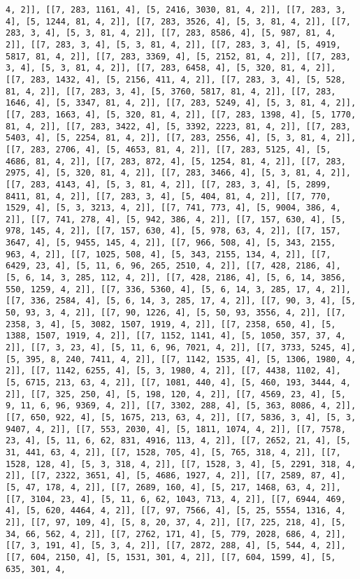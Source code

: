 \documentclass[12pt,fleqn]{article}\usepackage{../../common}
\begin{document}
\begin{verbatim}
4, 2]], [[7, 283, 1161, 4], [5, 2416, 3030, 81, 4, 2]], [[7, 283, 3, 4], [5, 1244, 81, 4, 2]], [[7, 283, 3526, 4], [5, 3, 81, 4, 2]], [[7, 283, 3, 4], [5, 3, 81, 4, 2]], [[7, 283, 8586, 4], [5, 987, 81, 4, 2]], [[7, 283, 3, 4], [5, 3, 81, 4, 2]], [[7, 283, 3, 4], [5, 4919, 5817, 81, 4, 2]], [[7, 283, 3369, 4], [5, 2152, 81, 4, 2]], [[7, 283, 3, 4], [5, 3, 81, 4, 2]], [[7, 283, 6458, 4], [5, 320, 81, 4, 2]], [[7, 283, 1432, 4], [5, 2156, 411, 4, 2]], [[7, 283, 3, 4], [5, 528, 81, 4, 2]], [[7, 283, 3, 4], [5, 3760, 5817, 81, 4, 2]], [[7, 283, 1646, 4], [5, 3347, 81, 4, 2]], [[7, 283, 5249, 4], [5, 3, 81, 4, 2]], [[7, 283, 1663, 4], [5, 320, 81, 4, 2]], [[7, 283, 1398, 4], [5, 1770, 81, 4, 2]], [[7, 283, 3422, 4], [5, 3392, 2223, 81, 4, 2]], [[7, 283, 5403, 4], [5, 2254, 81, 4, 2]], [[7, 283, 2556, 4], [5, 3, 81, 4, 2]], [[7, 283, 2706, 4], [5, 4653, 81, 4, 2]], [[7, 283, 5125, 4], [5, 4686, 81, 4, 2]], [[7, 283, 872, 4], [5, 1254, 81, 4, 2]], [[7, 283, 2975, 4], [5, 320, 81, 4, 2]], [[7, 283, 3466, 4], [5, 3, 81, 4, 2]], [[7, 283, 4143, 4], [5, 3, 81, 4, 2]], [[7, 283, 3, 4], [5, 2899, 8411, 81, 4, 2]], [[7, 283, 3, 4], [5, 404, 81, 4, 2]], [[7, 770, 1529, 4], [5, 3, 3213, 4, 2]], [[7, 741, 773, 4], [5, 9004, 386, 4, 2]], [[7, 741, 278, 4], [5, 942, 386, 4, 2]], [[7, 157, 630, 4], [5, 978, 145, 4, 2]], [[7, 157, 630, 4], [5, 978, 63, 4, 2]], [[7, 157, 3647, 4], [5, 9455, 145, 4, 2]], [[7, 966, 508, 4], [5, 343, 2155, 963, 4, 2]], [[7, 1025, 508, 4], [5, 343, 2155, 134, 4, 2]], [[7, 6429, 23, 4], [5, 11, 6, 96, 265, 2510, 4, 2]], [[7, 428, 2186, 4], [5, 6, 14, 3, 285, 112, 4, 2]], [[7, 428, 2186, 4], [5, 6, 14, 3856, 550, 1259, 4, 2]], [[7, 336, 5360, 4], [5, 6, 14, 3, 285, 17, 4, 2]], [[7, 336, 2584, 4], [5, 6, 14, 3, 285, 17, 4, 2]], [[7, 90, 3, 4], [5, 50, 93, 3, 4, 2]], [[7, 90, 1226, 4], [5, 50, 93, 3556, 4, 2]], [[7, 2358, 3, 4], [5, 3082, 1507, 1919, 4, 2]], [[7, 2358, 650, 4], [5, 1388, 1507, 1919, 4, 2]], [[7, 1152, 1141, 4], [5, 1050, 357, 37, 4, 2]], [[7, 3, 23, 4], [5, 11, 6, 96, 7021, 4, 2]], [[7, 3733, 5245, 4], [5, 395, 8, 240, 7411, 4, 2]], [[7, 1142, 1535, 4], [5, 1306, 1980, 4, 2]], [[7, 1142, 6255, 4], [5, 3, 1980, 4, 2]], [[7, 4438, 1102, 4], [5, 6715, 213, 63, 4, 2]], [[7, 1081, 440, 4], [5, 460, 193, 3444, 4, 2]], [[7, 325, 250, 4], [5, 198, 120, 4, 2]], [[7, 4569, 23, 4], [5, 9, 11, 6, 96, 9369, 4, 2]], [[7, 3302, 288, 4], [5, 363, 8086, 4, 2]], [[7, 650, 922, 4], [5, 1675, 213, 63, 4, 2]], [[7, 5836, 3, 4], [5, 3, 9407, 4, 2]], [[7, 553, 2030, 4], [5, 1811, 1074, 4, 2]], [[7, 7578, 23, 4], [5, 11, 6, 62, 831, 4916, 113, 4, 2]], [[7, 2652, 21, 4], [5, 31, 441, 63, 4, 2]], [[7, 1528, 705, 4], [5, 765, 318, 4, 2]], [[7, 1528, 128, 4], [5, 3, 318, 4, 2]], [[7, 1528, 3, 4], [5, 2291, 318, 4, 2]], [[7, 2322, 3651, 4], [5, 4686, 1927, 4, 2]], [[7, 2589, 87, 4], [5, 47, 178, 4, 2]], [[7, 2689, 160, 4], [5, 217, 1468, 63, 4, 2]], [[7, 3104, 23, 4], [5, 11, 6, 62, 1043, 713, 4, 2]], [[7, 6944, 469, 4], [5, 620, 4464, 4, 2]], [[7, 97, 7566, 4], [5, 25, 5554, 1316, 4, 2]], [[7, 97, 109, 4], [5, 8, 20, 37, 4, 2]], [[7, 225, 218, 4], [5, 34, 66, 562, 4, 2]], [[7, 2762, 171, 4], [5, 779, 2028, 686, 4, 2]], [[7, 3, 191, 4], [5, 3, 4, 2]], [[7, 2872, 288, 4], [5, 544, 4, 2]], [[7, 604, 2150, 4], [5, 1531, 301, 4, 2]], [[7, 604, 1599, 4], [5, 635, 301, 4, 
\end{verbatim}
\end{document}
